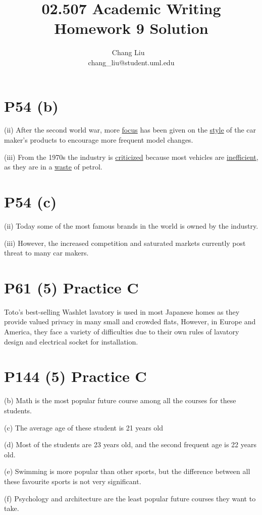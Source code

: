 \documentclass{article}
\title{02.507 Academic Writing Homework 9 Solution}
\author{Chang Liu ~\\ chang\_liu@student.uml.edu}
\begin{document}
\maketitle

\section{P54 (b)}

(ii) After the second world war, more \underline{focus} has been given on the \underline{style} of the car maker's products to encourage more frequent model changes.

(iii) From the 1970s the industry is \underline{criticized} because most vehicles are \underline{inefficient}, as they are in a \underline{waste} of petrol.


\section{P54 (c)}

(ii) Today some of the most famous brands in the world is owned by the industry.

(iii) However, the increased competition and saturated markets currently post threat to many car makers.

\section{P61 (5) Practice C}

Toto's best-selling Washlet lavatory is used in most Japanese homes as they provide valued privacy in many small and crowded flats, However, in Europe and America, they face a variety of difficulties due to their own rules of lavatory design and electrical socket for installation.


\section{P144 (5) Practice C}

(b) Math is the most popular future course among all the courses for these students.

(c) The average age of these student is 21 years old

(d) Most of the students are 23 years old, and the second frequent age is 22 years old.

(e) Swimming is more popular than other sports, but the difference between all these favourite sports is not very significant.

(f) Psychology and architecture are the least popular future courses they want to take.
\end{document}
